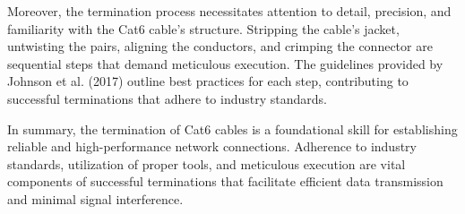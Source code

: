 Moreover, the termination process necessitates attention to detail, precision,
and familiarity with the Cat6 cable's structure. Stripping the cable's jacket,
untwisting the pairs, aligning the conductors, and crimping the connector are
sequential steps that demand meticulous execution. The guidelines provided by
Johnson et al. (2017) outline best practices for each step, contributing to
successful terminations that adhere to industry standards.

In summary, the termination of Cat6 cables is a foundational skill for
establishing reliable and high-performance network connections. Adherence to
industry standards, utilization of proper tools, and meticulous execution are
vital components of successful terminations that facilitate efficient data
transmission and minimal signal interference.
